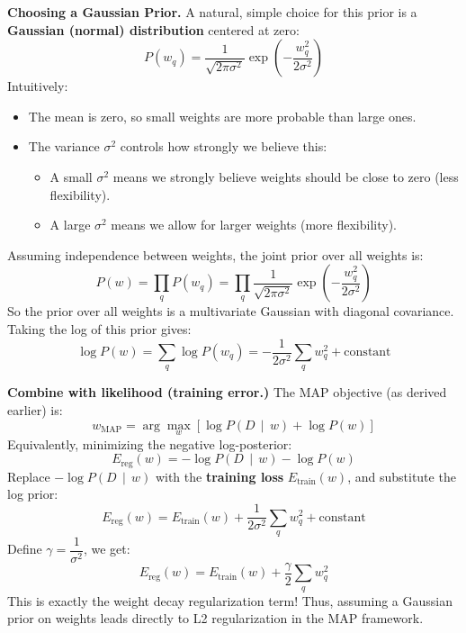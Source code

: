 \highspace
\textcolor{Green3}{ \textbf{Choosing a Gaussian Prior.}} A natural, simple choice for this prior is a \textbf{Gaussian (normal) distribution} centered at zero:
\begin{equation*}
    P\left(w_q\right) = \dfrac{1}{\sqrt{2 \pi \sigma^2}} \exp\left(-\dfrac{w_q^2}{2 \sigma^2}\right)
\end{equation*}
Intuitively:
\begin{itemize}
    \item The mean is zero, so small weights are more probable than large ones.
    \item The variance $\sigma^2$ controls how strongly we believe this:
    \begin{itemize}
        \item A small $\sigma^2$ means we strongly believe weights should be close to zero (less flexibility).
        \item A large $\sigma^2$ means we allow for larger weights (more flexibility).
    \end{itemize}
\end{itemize}
Assuming independence between weights, the joint prior over all weights is:
\begin{equation*}
    P\left(w\right) = \prod_{q} P\left(w_q\right) = \prod_{q} \dfrac{1}{\sqrt{2 \pi \sigma^2}} \exp\left(-\dfrac{w_q^2}{2 \sigma^2}\right)
\end{equation*}
So the prior over all weights is a multivariate Gaussian with diagonal covariance. Taking the log of this prior gives:
\begin{equation*}
    \log P\left(w\right) = \sum_{q} \log P\left(w_q\right) = -\dfrac{1}{2 \sigma^2} \sum_{q} w_q^2 + \text{constant}
\end{equation*}

\highspace
\textcolor{Green3}{ \textbf{Combine with likelihood (training error.)}} The MAP objective (as derived earlier) is:
\begin{equation*}
    w_{\text{MAP}} = \arg\max_{w} \left[ \log P\left(D \, \mid \, w\right) + \log P\left(w\right) \right]
\end{equation*}
Equivalently, minimizing the negative log-posterior:
\begin{equation*}
    E_{\text{reg}}(w) = -\log P\left(D \, \mid \, w\right) - \log P\left(w\right)
\end{equation*}
Replace $-\log P\left(D \, \mid \, w\right)$ with the \textbf{training loss} $E_{\text{train}}(w)$, and substitute the log prior:
\begin{equation*}
    E_{\text{reg}}(w) = E_{\text{train}}(w) + \dfrac{1}{2 \sigma^2} \sum_{q} w_q^2 + \text{constant}
\end{equation*}
Define $\gamma = \dfrac{1}{\sigma^2}$, we get:
\begin{equation*}
    E_{\text{reg}}(w) = E_{\text{train}}(w) + \dfrac{\gamma}{2} \sum_{q} w_q^2
\end{equation*}
This is exactly the weight decay regularization term! Thus, assuming a Gaussian prior on weights leads directly to L2 regularization in the MAP framework.

